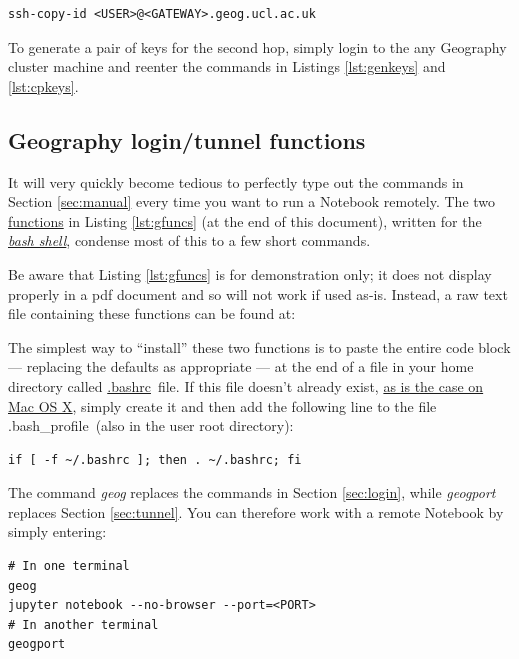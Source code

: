 \documentclass[a4paper]{article}
\begin{document}
\begin{lstlisting}[caption={Copy public key to geography file system}, label={lst:cpkeys}]
ssh-copy-id <USER>@<GATEWAY>.geog.ucl.ac.uk
\end{lstlisting}

To generate a pair of keys for the second hop, simply login to the any Geography cluster machine and reenter the commands in Listings \ref{lst:genkeys} and \ref{lst:cpkeys}.

\subsection{Geography login/tunnel functions}
\label{sec:gfuncs}

It will very quickly become tedious to perfectly type out the commands in Section \ref{sec:manual} every time you want to run a Notebook remotely.
The two \href{https://www.shellscript.sh/functions.html}{functions} in Listing \ref{lst:gfuncs} (at the end of this document), written for the \href{http://cs.lmu.edu/~ray/notes/bash/}{\emph{bash shell}}, condense most of this to a few short commands.

Be aware that Listing \ref{lst:gfuncs} is for demonstration only; it does not display properly in a pdf document and so will not work if used as-is.
Instead, a raw text file containing these functions can be found at:


The simplest way to ``install'' these two functions is to paste the entire code block --- replacing the defaults as appropriate --- at the end of a file in your home directory called \href{http://superuser.com/questions/49289/what-is-the-bashrc-file}{.bashrc}~file.
If this file doesn't already exist, \href{http://apple.stackexchange.com/a/119714}{as is the case on Mac OS X}, simply create it and then add the following line to the file .bash\_profile~(also in the user root directory):

\begin{lstlisting}[caption={Source .bashrc on startup}, label={lst:srcbashrc}]
if [ -f ~/.bashrc ]; then . ~/.bashrc; fi
\end{lstlisting}

The command \emph{geog} replaces the commands in Section \ref{sec:login}, while \emph{geogport} replaces Section \ref{sec:tunnel}.
You can therefore work with a remote Notebook by simply entering:
\begin{lstlisting}[caption={Set up and tunnel to remote Notebook server}, label={lst:usegfuncs}]
# In one terminal
geog
jupyter notebook --no-browser --port=<PORT>
# In another terminal
geogport
\end{lstlisting}
\end{document}
